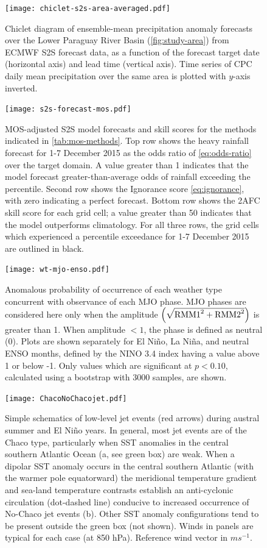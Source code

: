 \documentclass[twocol]{ametsoc}
\begin{document}
\begin{figure}
	\noindent\texttt{[image: chiclet-s2s-area-averaged.pdf]}
	\caption{
    Chiclet diagram \citep{Carbin:2016fx} of ensemble-mean precipitation anomaly forecasts over the Lower Paraguay River Basin (\cref{fig:study-area}) from ECMWF S2S forecast data, as a function of the forecast target date (horizontal axis) and lead time (vertical axis). Time series of CPC daily mean precipitation over the same area is plotted with $y$-axis inverted.
	}
  \label{fig:chiclet}
\end{figure}


\begin{figure}
	\noindent\texttt{[image: s2s-forecast-mos.pdf]}
	\caption{
		MOS-adjusted S2S model forecasts and skill scores for the methods indicated in \cref{tab:mos-methods}.
		Top row shows the heavy rainfall forecast for 1-7 December 2015 as the odds ratio of \cref{eq:odds-ratio} over the target domain.
		A value greater than 1 indicates that the model forecast greater-than-average odds of rainfall exceeding the  percentile.
        Second row shows the Ignorance score \cref{eq:ignorance}, with zero indicating a perfect forecast.
		Bottom row shows the 2AFC skill score for each grid cell; a value greater than 50 indicates that the model outperforms climatology.
		For all three rows, the grid cells which experienced a  percentile exceedance for 1-7 December 2015 are outlined in black.
	}
  \label{fig:subs-prob-fcst}
\end{figure}

\begin{figure}
	\noindent\texttt{[image: wt-mjo-enso.pdf]}
	\caption{
		Anomalous probability of occurrence of each weather type concurrent with observance of each MJO phase.
		MJO phases are considered here only when the amplitude $\qty(\sqrt{\text{RMM1}^2 + \text{RMM2}^2})$ is greater than 1.
		When amplitude $< 1$, the phase is defined as neutral (0).
		Plots are shown separately for El Ni\~no, La Ni\~na, and neutral ENSO months, defined by the NINO 3.4 index having a value above 1 or below -1.
		Only values which are significant at $p<0.10$, calculated using a bootstrap with 3000 samples, are shown.
	}
  \label{fig:wt-mjo-enso}
\end{figure}

\begin{figure}
	\noindent\texttt{[image: ChacoNoChacojet.pdf]}
	\caption{
		Simple schematics of low-level jet events (red arrows) during austral summer and El Ni\~no years.
		In general, most jet events are of the Chaco type, particularly when SST anomalies in the central southern Atlantic Ocean (a, see green box) are weak.
		When a dipolar SST anomaly occurs in the central southern Atlantic (with the warmer pole equatorward) the meridional temperature gradient and sea-land temperature contrasts establish an anti-cyclonic circulation (dot-dashed line) conducive to increased occurrence of No-Chaco jet events (b).
		Other SST anomaly configurations tend to be present outside the green box (not shown).
		Winds in panels are typical for each case (at 850 hPa).
		Reference wind vector in $m s^{-1}$.
	}
  \label{fig:chaco-nochaco}
\end{figure}
\end{document}
